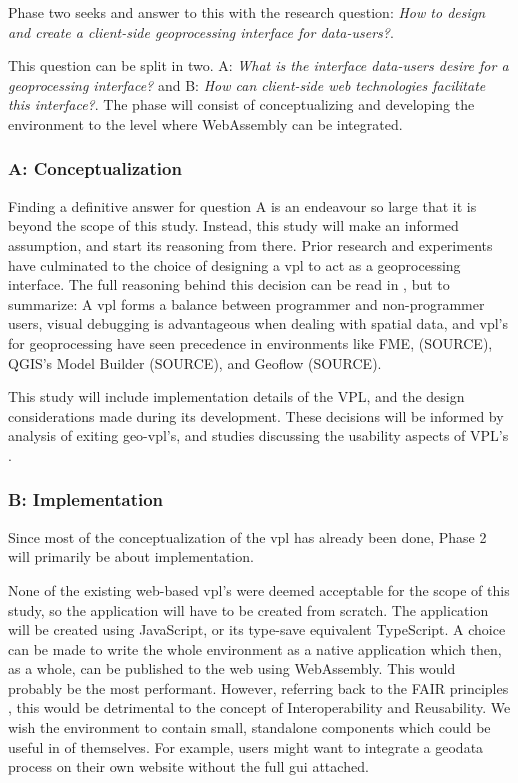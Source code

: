 Phase two seeks and answer to this with the research question: \textit{How to design and create a client-side geoprocessing interface for data-users?}. 

This question can be split in two. A: \textit{What is the interface data-users desire for a geoprocessing interface?} and B:  \textit{How can client-side web technologies facilitate this interface?}. The phase will consist of conceptualizing and developing the environment to the level where WebAssembly can be integrated.  

\subsubsection*{A: Conceptualization}

Finding a definitive answer for question A is an endeavour so large that it is beyond the scope of this study. Instead, this study will make an informed assumption, and start its reasoning from there. 
Prior research and experiments  have culminated to the choice of designing a \ac{vpl} to act as a geoprocessing interface. The full reasoning behind this decision can be read in , but to summarize:
A \ac{vpl} forms a balance between programmer and non-programmer users, visual debugging is advantageous when dealing with spatial data, and \ac{vpl}'s for geoprocessing have seen precedence in environments like FME, (SOURCE), QGIS's Model Builder (SOURCE), and Geoflow (SOURCE).

This study will include implementation details of the VPL, and the design considerations made during its development. These decisions will be informed by analysis of exiting geo-vpl's, and studies discussing the usability aspects of VPL's \cite{green_usability_1996, peters_geoflow_2019}.


\subsubsection*{B: Implementation}

Since most of the conceptualization of the \ac{vpl} has already been done, Phase 2 will primarily be about implementation. 

None of the existing web-based \ac{vpl}'s were deemed acceptable for the scope of this study, so the application will have to be created from scratch. 
The application will be created using JavaScript, or its type-save equivalent TypeScript. 
A choice can be made to write the whole environment as a native application which then, as a whole, can be published to the web using WebAssembly. 
This would probably be the most performant. 
However, referring back to the FAIR principles \cite{mark_d_wilkinson_fair_2016}, this would be detrimental to the concept of Interoperability and Reusability. 
We wish the environment to contain small, standalone components which could be useful in of themselves. 
For example, users might want to integrate a geodata process on their own website without the full \ac{gui} attached.


